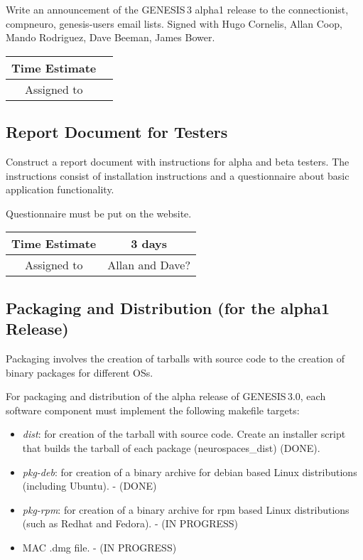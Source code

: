 \documentclass[12pt]{article}
\begin{document}
Write an announcement of the GENESIS\,3 alpha1 release to the
connectionist,
compneuro,
genesis-users
email lists.  Signed with Hugo Cornelis, Allan Coop,
Mando Rodriguez, Dave Beeman, James Bower.

\begin{center}
  \vspace{5mm}
  \centering
  \begin{tabular}{|c|c|}
    \hline
    Time Estimate
    & \\
    \hline
    Assigned to
    & \\
    \hline
  \end{tabular}
\end{center}


\subsection{Report Document for Testers}

Construct a report document with instructions for alpha and beta
testers.  The instructions consist of installation instructions and a
questionnaire about basic application functionality.

Questionnaire must be put on the website.


\begin{center}
  \vspace{5mm}
  \centering
  \begin{tabular}{|c|c|}
    \hline
    Time Estimate
    & 3 days \\
    \hline
    Assigned to
    &  Allan and Dave? \\
    \hline
  \end{tabular}
\end{center}


\subsection{Packaging and Distribution (for the alpha1 Release)}

Packaging involves the creation of tarballs with source code to the
creation of binary packages for different OSs.

For packaging and distribution of the alpha release of GENESIS\,3.0,
each software component must implement the following makefile targets:

\begin{itemize}
\item {\it dist}: for creation of the tarball with source code.
  Create an installer script that builds the tarball of each package
  (neurospaces\_dist) (DONE).
\item {\it pkg-deb}: for creation of a binary archive for debian based
  Linux distributions (including Ubuntu). - (DONE)
\item {\it pkg-rpm}: for creation of a binary archive for rpm based Linux
  distributions (such as Redhat and Fedora). - (IN PROGRESS)
\item MAC .dmg file. - (IN PROGRESS)
\end{itemize}
\end{document}
